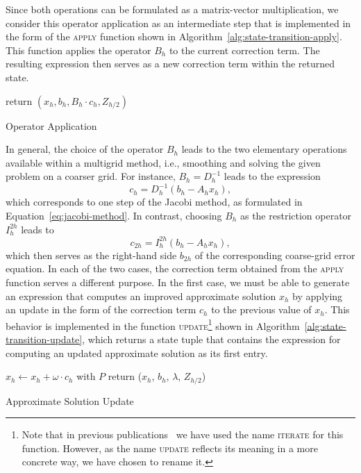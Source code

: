 Since both operations can be formulated as a matrix-vector multiplication, we consider this operator application as an intermediate step that is implemented in the form of the \textsc{apply} function shown in Algorithm~\ref{alg:state-transition-apply}.
This function applies the operator $B_h$ to the current correction term. 
The resulting expression then serves as a new correction term within the returned state.
\begin{algorithm}
	\begin{algorithmic}
		\State return $(x_h, b_h, B_h\cdot c_h, Z_{h/2})$
		\EndFunction
	\end{algorithmic}
\caption{Operator Application}
\label{alg:state-transition-apply}
\end{algorithm}
In general, the choice of the operator $B_h$ leads to the two elementary operations available within a multigrid method, i.e., smoothing and solving the given problem on a coarser grid.
For instance, $B_h = D_h^{-1}$ leads to the expression
\begin{equation*}
	c_h = D_h^{-1} (b_h - A_h x_h),
\end{equation*}
which corresponds to one step of the Jacobi method, as formulated in Equation~\eqref{eq:jacobi-method}.
In contrast, choosing $B_h$ as the restriction operator $I_h^{2h}$ leads to
\begin{equation*}
	c_{2h} = I_{h}^{2h} (b_h - A_h x_h),
\end{equation*}
which then serves as the right-hand side $b_{2h}$ of the corresponding coarse-grid error equation.
In each of the two cases, the correction term obtained from the \textsc{apply} function serves a different purpose.
In the first case, we must be able to generate an expression that computes an improved approximate solution $x_h$ by applying an update in the form of the correction term $c_h$ to the previous value of $x_h$. 
This behavior is implemented in the function \textsc{update}\footnote{Note that in previous publications~\cite{schmitt2020constructing,schmitt2021evostencils} we have used the name \textsc{iterate} for this function. However, as the name \textsc{update} reflects its meaning in a more concrete way, we have chosen to rename it.} shown in Algorithm~\ref{alg:state-transition-update}, which returns a state tuple that contains the expression for computing an updated approximate solution as its first entry.
\begin{algorithm}
	\begin{algorithmic}
		\Function{update}{$\omega$, $P$, ($x_h$, $b_h$, $c_h$, $Z_{h/2}$)}
			\State $x_h \gets x_h + \omega \cdot c_h$ with $P$
			\State return ($x_h$, $b_h$, $\lambda$, $Z_{h/2}$) 
		\EndFunction
	\end{algorithmic}
 \caption{Approximate Solution Update}
\label{alg:state-transition-update}
\end{algorithm}
